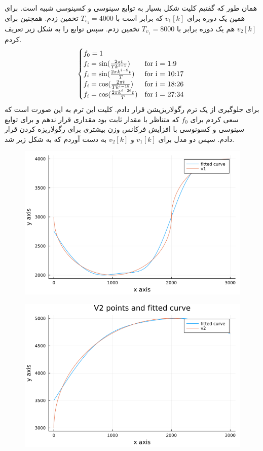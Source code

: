 \documentclass[a4paper]{article}
\begin{document}
\subsection{}
همان طور که گفتیم کلیت شکل بسیار به توابع سینوسی و کسینوسی شبیه است. برای همین یک دوره برای
$ v_{1}[k] $
که برابر است با 
$ T_{v_{1}} = 4000 $
تخمین زدم. همچنین برای 
$ v_{2}[k] $
هم یک دوره برابر با
$ T_{v_{1}} = 8000 $
تخمین زدم. سپس توابع 
را به شکل زیر تعریف کردم. 
\begin{equation*}
	\begin{cases}
		f_{0} = 1 \\
		f_{i} = \sin(\frac{2 \pi t}{T k^{i-1}}) & \text{for} $ i = 1:9 $ \\
		f_{i} = \sin(\frac{2 \pi k^{i-9} t}{T}) & \text{for} $ i = 10:17 $ \\
		f_{i} = \cos(\frac{2 \pi t}{T k^{i-18}}) & \text{for} $ i = 18:26 $ \\
		f_{i} = \cos(\frac{2 \pi k^{i-26} t}{T}) & \text{for} $ i = 27:34 $ \\
	\end{cases}
\end{equation*}
برای جلوگیری از 
یک ترم رگولاریزیشن قرار دادم. کلیت این ترم به این صورت است که سعی کردم برای $ f_{0} $ که متناظر با مقدار ثابت بود مقداری قرار ندهم و برای توابع سینوسی و کسونوسی با افزایش فرکانس وزن بیشتری برای رگولاریزه کردن قرار دادم. سپس دو مدل برای 
$ v_{1}[k] $
و
$ v_{2}[k] $
به دست آوردم که به شکل زیر شد. 
\begin{figure}[H]
	\centering
	\includegraphics[width=0.75 \linewidth]{V1_fit}
	\caption{
	}
\end{figure}
\begin{figure}[H]
	\centering
	\includegraphics[width=0.75 \linewidth]{V2_fit}
	\caption{
	}
\end{figure}
\end{document}
